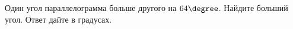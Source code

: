 \begin{ex}
	\begin{condition}
		Один угол параллелограмма больше другого на \( 64 \degree \). Найдите больший угол. Ответ дайте в градусах.
	\end{condition}
\end{ex}